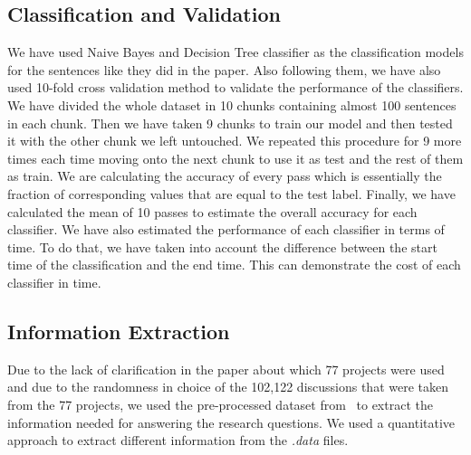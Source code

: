 \subsection{Classification and Validation}
We have used Naive Bayes and Decision Tree classifier as the classification models for the sentences like they did in the paper. Also following them, we have also used 10-fold cross validation method to validate the performance of the classifiers. We have divided the whole dataset in 10 chunks containing almost 100 sentences in each chunk. Then we have taken 9 chunks to train our model and then tested it with the other chunk we left untouched. We repeated this procedure for 9 more times each time moving onto the next chunk to use it as test and the rest of them as train. We are calculating the accuracy of every pass which is essentially the fraction of corresponding values that are equal to the test label. Finally, we have calculated the mean of 10 passes to estimate the overall accuracy for each classifier. We have also estimated the performance of each classifier in terms of time. To do that, we have taken into account the difference between the start time of the classification and the end time. This can demonstrate the cost of each classifier in time.

\subsection{Information Extraction}
Due to the lack of clarification in the paper about which 77 projects were used and due to the randomness in choice of the 102,122 discussions that were taken from the 77 projects, we used the pre-processed dataset from~\cite{Brunet2014a} to extract the information needed for answering the research questions. We used a quantitative approach to extract different information from the \emph{.data} files. 